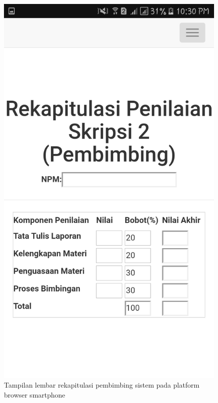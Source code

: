 \begin{figure}[H]
	\centering
	\includegraphics[scale=0.2]{Gambar/hp_pembimbing}
	\caption{Tampilan lembar rekapitulasi pembimbing sistem pada platform browser smartphone}
	\label{fig:hp_pembimbing}
\end{figure}